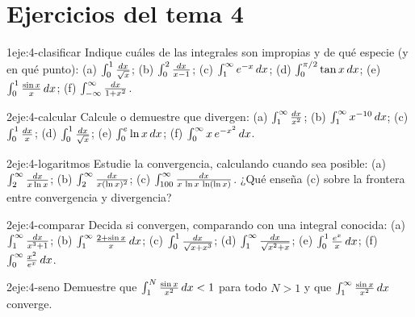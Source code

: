 \section*{Ejercicios del tema 4}

\begin{ejercicio}{1}{eje:4-clasificar}
Indique cuáles de las integrales son impropias y de qué especie (y en qué punto): (a) $\int_0^{1}\frac{\mathop{}\!d x}{\sqrt x}$; (b) $\int_0^{2}\frac{\mathop{}\!d x}{x-1}$; (c) $\int_1^{\infty}e^{-x}\mathop{}\!d x$; (d) $\int_0^{\pi/2}\tan x\mathop{}\!d x$; (e) $\int_0^{1}\frac{\sin x}{x}\mathop{}\!d x$; (f) $\int_{-\infty}^{\infty}\frac{\mathop{}\!d x}{1+x^{2}}$.
\end{ejercicio}

\begin{ejercicio}{2}{eje:4-calcular}
Calcule o demuestre que divergen: (a) $\int_1^{\infty}\frac{\mathop{}\!d x}{x^{2}}$; (b) $\int_1^{\infty}x^{-10}\mathop{}\!d x$; (c) $\int_0^{1}\frac{\mathop{}\!d x}{x}$; (d) $\int_0^{1}\frac{\mathop{}\!d x}{\sqrt x}$; (e) $\int_0^{e}\ln x\mathop{}\!d x$; (f) $\int_0^{\infty}x\,e^{-x^{2}}\mathop{}\!d x$.
\end{ejercicio}

\begin{ejercicio}{2}{eje:4-logaritmos}
Estudie la convergencia, calculando cuando sea posible: (a) $\int_2^{\infty}\frac{\mathop{}\!d x}{x\ln x}$; (b) $\int_2^{\infty}\frac{\mathop{}\!d x}{x(\ln x)^{2}}$; (c) $\int_{100}^{\infty}\frac{\mathop{}\!d x}{x\,\ln x\,\ln(\ln x)}$. ¿Qué enseña (c) sobre la frontera entre convergencia y divergencia?
\end{ejercicio}

\begin{ejercicio}{2}{eje:4-comparar}
Decida si convergen, comparando con una integral conocida: (a) $\int_1^{\infty}\frac{\mathop{}\!d x}{x^{3}+1}$; (b) $\int_1^{\infty}\frac{2+\sin x}{x}\mathop{}\!d x$; (c) $\int_0^{1}\frac{\mathop{}\!d x}{\sqrt{x+x^{3}}}$; (d) $\int_1^{\infty}\frac{\mathop{}\!d x}{\sqrt{x^{2}+x}}$; (e) $\int_0^{1}\frac{e^{x}}{x}\mathop{}\!d x$; (f) $\int_0^{\infty}\frac{x^{2}}{e^{x}}\mathop{}\!d x$.
\end{ejercicio}

\begin{ejercicio}{2}{eje:4-seno}
Demuestre que $\int_1^{N}\frac{\sin x}{x^{2}}\mathop{}\!d x<1$ para todo $N>1$ y que $\int_1^{\infty}\frac{\sin x}{x^{2}}\mathop{}\!d x$ converge.
\end{ejercicio}

